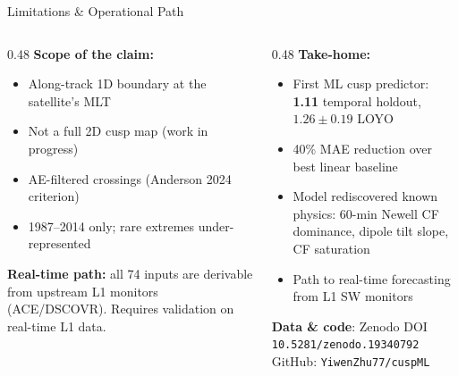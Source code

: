 \documentclass[aspectratio=169,11pt]{beamer}
\begin{document}
\begin{frame}{Limitations \& Operational Path}
\begin{columns}[T]
\begin{column}{0.48\textwidth}
\textbf{Scope of the claim:}
\begin{itemize}
\item Along-track 1D boundary at the satellite's MLT
\item Not a full 2D cusp map (work in progress)
\item AE-filtered crossings (Anderson 2024 criterion)
\item 1987--2014 only; rare extremes under-represented
\end{itemize}
\vspace{0.2cm}
\textbf{Real-time path:} all 74 inputs are derivable from upstream L1 monitors (ACE/DSCOVR). Requires validation on real-time L1 data.
\end{column}
\begin{column}{0.48\textwidth}
\textbf{Take-home:}
\begin{itemize}
\item First ML cusp predictor: \textbf{1.11\textdegree{}} temporal holdout, $1.26 \pm 0.19$\textdegree{} LOYO
\item 40\% MAE reduction over best linear baseline
\item Model rediscovered known physics: 60-min Newell CF dominance, dipole tilt slope, CF saturation
\item Path to real-time forecasting from L1 SW monitors
\end{itemize}
\vspace{0.3cm}
\small\textbf{Data \& code}: Zenodo DOI \texttt{10.5281/zenodo.19340792}\\
GitHub: \texttt{YiwenZhu77/cuspML}
\end{column}
\end{columns}
\end{frame}
\end{document}
